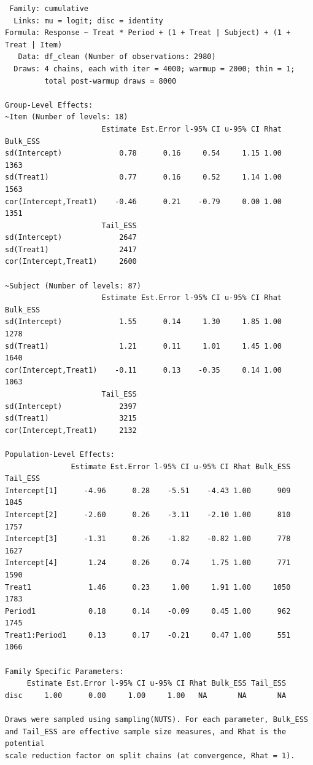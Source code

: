 \documentclass[
  12pt,
  a4paper,
  extrafontsizes,
  onecolumn,
  openright,
  table]{memoir}
\begin{document}
\begin{verbatim}
 Family: cumulative 
  Links: mu = logit; disc = identity 
Formula: Response ~ Treat * Period + (1 + Treat | Subject) + (1 + Treat | Item) 
   Data: df_clean (Number of observations: 2980) 
  Draws: 4 chains, each with iter = 4000; warmup = 2000; thin = 1;
         total post-warmup draws = 8000

Group-Level Effects: 
~Item (Number of levels: 18) 
                      Estimate Est.Error l-95% CI u-95% CI Rhat Bulk_ESS
sd(Intercept)             0.78      0.16     0.54     1.15 1.00     1363
sd(Treat1)                0.77      0.16     0.52     1.14 1.00     1563
cor(Intercept,Treat1)    -0.46      0.21    -0.79     0.00 1.00     1351
                      Tail_ESS
sd(Intercept)             2647
sd(Treat1)                2417
cor(Intercept,Treat1)     2600

~Subject (Number of levels: 87) 
                      Estimate Est.Error l-95% CI u-95% CI Rhat Bulk_ESS
sd(Intercept)             1.55      0.14     1.30     1.85 1.00     1278
sd(Treat1)                1.21      0.11     1.01     1.45 1.00     1640
cor(Intercept,Treat1)    -0.11      0.13    -0.35     0.14 1.00     1063
                      Tail_ESS
sd(Intercept)             2397
sd(Treat1)                3215
cor(Intercept,Treat1)     2132

Population-Level Effects: 
               Estimate Est.Error l-95% CI u-95% CI Rhat Bulk_ESS Tail_ESS
Intercept[1]      -4.96      0.28    -5.51    -4.43 1.00      909     1845
Intercept[2]      -2.60      0.26    -3.11    -2.10 1.00      810     1757
Intercept[3]      -1.31      0.26    -1.82    -0.82 1.00      778     1627
Intercept[4]       1.24      0.26     0.74     1.75 1.00      771     1590
Treat1             1.46      0.23     1.00     1.91 1.00     1050     1783
Period1            0.18      0.14    -0.09     0.45 1.00      962     1745
Treat1:Period1     0.13      0.17    -0.21     0.47 1.00      551     1066

Family Specific Parameters: 
     Estimate Est.Error l-95% CI u-95% CI Rhat Bulk_ESS Tail_ESS
disc     1.00      0.00     1.00     1.00   NA       NA       NA

Draws were sampled using sampling(NUTS). For each parameter, Bulk_ESS
and Tail_ESS are effective sample size measures, and Rhat is the potential
scale reduction factor on split chains (at convergence, Rhat = 1).
\end{verbatim}

\normalsize
\end{document}

